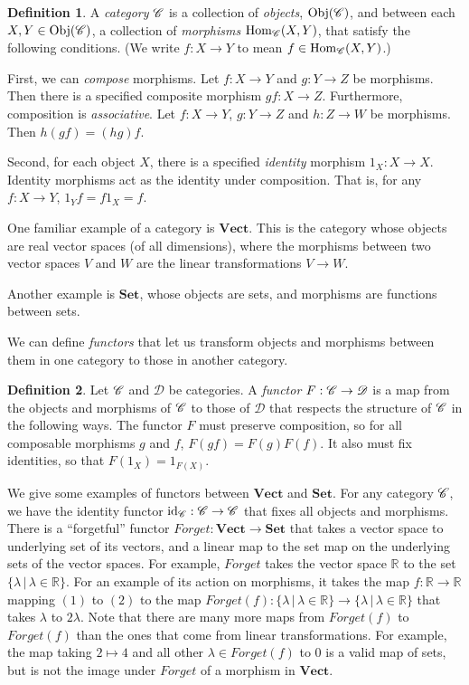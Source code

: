\documentclass[a4paper,12pt,leqno]{article} \usepackage{amsmath}
\newcommand{\RR}{\mathbb{R}} \newcommand{\QQ}{\mathbb{Q}}
\newcommand{\curD}{\mathscr{D}} \newcommand{\curI}{\mathscr{I}}
\newcommand{\id}{\ensuremath{\operatorname{id}}}
\newcommand{\Hom}{\ensuremath{\operatorname{Hom}}}
\newcommand{\Obj}{\ensuremath{\operatorname{Obj}}}
\theoremstyle{definition}
\newtheorem{defn}{Definition}
\begin{document}
\begin{defn}
  A \emph{category} $\mathscr{C}$ is a collection of \emph{objects}, $\Obj(\curC)$,
  and between each $X, Y\in\Obj(\curC)$, a collection of \emph{morphisms}
  $\Hom_{\curC}(X, Y)$, that satisfy the following conditions.
  (We write $f: X\to Y$ to mean $f\in \Hom_{\curC}(X, Y)$.)

  First, we can \emph{compose} morphisms.
  Let $f: X\to Y$ and $g: Y\to Z$ be morphisms.
  Then there is a specified composite morphism $gf: X\to Z$.
  Furthermore, composition is \emph{associative}.
  Let $f: X\to Y$, $g: Y\to Z$ and $h: Z\to W$ be morphisms.
  Then $h(gf) = (hg)f$.

  Second, for each object $X$, there is a specified \emph{identity} morphism
  $1_X: X\to X$.
  Identity morphisms act as the identity under composition.
  That is, for any $f: X\to Y$, $1_Yf = f1_X = f$.
\end{defn}

One familiar example of a category is $\textbf{Vect}$.
This is the category whose objects are real vector spaces (of all dimensions),
where the morphisms between two vector spaces $V$ and $W$ are the linear
transformations $V\to W$.

Another example is $\textbf{Set}$, whose objects are sets, and morphisms are
functions between sets.

We can define \emph{functors} that let us transform objects and morphisms between them in
one category to those in another category.

\begin{defn}
  Let $\mathscr{C}$ and $\curD$ be categories.
  A \emph{functor} $F: \curC\to \curD$ is a map from the objects and morphisms
  of $\mathscr{C}$ to those of $\curD$ that respects the structure of $\mathscr{C}$ in the
  following ways.
  The functor $F$ must preserve composition, so for all composable morphisms
  $g$ and $f$, $F(gf) = F(g)F(f)$.
  It also must fix identities, so that $F(1_X) = 1_{F(X)}$.
\end{defn}

We give some examples of functors between $\textbf{Vect}$ and $\textbf{Set}$.
For any category $\mathscr{C}$, we have the identity functor $\id_{\curC}:
\curC\to \curC$ that fixes all objects and morphisms.
There is a ``forgetful'' functor $Forget: \textbf{Vect}\to \textbf{Set}$ that
takes a vector space to underlying set of its vectors, and a linear map to the
set map on the underlying sets of the vector spaces.
For example, $Forget$ takes the vector space $\RR$ to the set $\{\lambda\,|\,
\lambda\in\RR\}$.
For an example of its action on morphisms, it takes the map $f: \RR\to\RR$
mapping $(1)$ to $(2)$ to the map
$Forget(f): \{\lambda\,|\,\lambda\in\RR\}\to \{\lambda\,|\,\lambda\in\RR\}$
that takes $\lambda$ to $2\lambda$.
Note that there are many more maps from $Forget(f)$ to $Forget(f)$ than the
ones that come from linear transformations.
For example, the map taking $2\mapsto 4$ and all other $\lambda\in Forget(f)$
to $0$ is a valid map of sets, but is not the image under $Forget$ of
a morphism in $\textbf{Vect}$.
\end{document}
